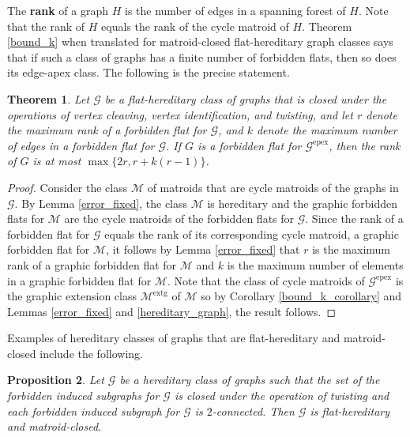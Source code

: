 \documentclass[11pt]{amsart}
\newtheorem{theorem}{Theorem}[section]
\newtheorem{proposition}[theorem]{Proposition}
\theoremstyle{definition}
\theoremstyle{remark}
\numberwithin{equation}{section}
\newcommand\Meg{\mathcal{M}^\mathrm{extg}}
\newcommand\Ga{\mathcal{G}^\mathrm{epex}}
\begin{document}
The \textbf{rank} of a graph $H$ is the number of edges in a spanning forest of $H$. Note that the rank of $H$ equals the rank of the cycle matroid of $H$. 
Theorem \ref{bound_k} when translated for matroid-closed flat-hereditary graph classes says that if such a class of graphs has a finite number of forbidden flats, then so does its edge-apex class. The following is the precise statement. 


\begin{theorem}
\label{bound_k_graph}
Let $\mathcal{G}$ be a flat-hereditary class of graphs that is closed under the operations of vertex cleaving, vertex identification, and twisting, and let $r$ denote the maximum rank of a forbidden flat for  $\mathcal{G}$, and $k$ denote the maximum number of edges in a forbidden flat for $\mathcal{G}$. If $G$ is a forbidden flat for $\Ga$, then the rank of $G$ is at most $\max \{2r, r + k(r-1)\}$. 
\end{theorem}


\begin{proof}
Consider the class $\mathcal{M}$ of matroids that are cycle matroids of the graphs in $\mathcal{G}$. By Lemma \ref{error_fixed}, the class $\mathcal{M}$ is hereditary and the graphic forbidden flats for $\mathcal{M}$ are the cycle matroids of the forbidden flats for $\mathcal{G}$. Since the rank of a forbidden flat for $\mathcal{G}$ equals the rank of its corresponding cycle matroid, a graphic forbidden flat for $\mathcal{M}$, it follows by Lemma \ref{error_fixed} that $r$ is the maximum rank of a graphic forbidden flat for $\mathcal{M}$ and $k$ is the maximum number of elements in a graphic forbidden flat for $\mathcal{M}$. Note that the class of cycle matroids of $\Ga$ is the graphic extension class $\Meg$ of $\mathcal{M}$ so by Corollary \ref{bound_k_corollary} and Lemmas \ref{error_fixed} and \ref{hereditary_graph}, the result follows.
\end{proof}


Examples of hereditary classes of graphs that are flat-hereditary and matroid-closed include the following.

\begin{proposition}
Let $\mathcal{G}$ be a hereditary class of graphs such that the set of the forbidden induced subgraphs for $\mathcal{G}$ is closed under the operation of twisting and each forbidden induced subgraph for $\mathcal{G}$ is $2$-connected. Then $\mathcal{G}$ is flat-hereditary and matroid-closed. 
\end{proposition}
\end{document}
